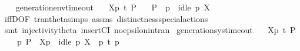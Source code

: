\begin{isabellebody}
\endisatagproof
{\isafoldproof}%
%
\isadelimproof
\isanewline
%
\endisadelimproof
\ \ \isanewline
{}\isamarkupfalse%
\ generation{\isacharunderscore}{\kern0pt}env{\isacharunderscore}{\kern0pt}timeout{\isacharcolon}{\kern0pt}\isanewline
\ \ \ {\isacartoucheopen}{\isasymtheta}{\isacharbrackleft}{\kern0pt}X{\isacharbrackright}{\kern0pt}{\isacharparenleft}{\kern0pt}p{\isacharparenright}{\kern0pt}\ {\isasymlongmapsto}\isactrlsup {\isasymtheta}t{\isacharunderscore}{\kern0pt}{\isasymepsilon}\ P{\isacharprime}{\kern0pt}{\isacartoucheclose}\isanewline
\ \ \ {\isacartoucheopen}P{\isacharprime}{\kern0pt}\ {\isacharequal}{\kern0pt}\ {\isasymtheta}{\isacharparenleft}{\kern0pt}p{\isacharparenright}{\kern0pt}\ {\isasymand}\ idle\ p\ X{\isacartoucheclose}\isanewline
%
\isadelimproof
\ \ %
\endisadelimproof
%
\isatagproof
{}\isamarkupfalse%
\ iffD{}{\isacharbrackleft}{\kern0pt}OF\ tran{\isacharunderscore}{\kern0pt}theta{\isachardot}{\kern0pt}simps\ assms{\isacharbrackright}{\kern0pt}\ distinctness{\isacharunderscore}{\kern0pt}special{\isacharunderscore}{\kern0pt}actions\isanewline
\ \ \isamarkupfalse%
\ {\isacharparenleft}{\kern0pt}smt\ injectivity{\isacharunderscore}{\kern0pt}theta{\isacharparenleft}{\kern0pt}{}{\isacharparenright}{\kern0pt}\ insertCI\ no{\isacharunderscore}{\kern0pt}epsilon{\isacharunderscore}{\kern0pt}in{\isacharunderscore}{\kern0pt}tran{\isacharparenleft}{\kern0pt}{}{\isacharparenright}{\kern0pt}{\isacharparenright}{\kern0pt}{\isacharplus}{\kern0pt}%
\endisatagproof
{\isafoldproof}%
%
\isadelimproof
\isanewline
%
\endisadelimproof
\isanewline
{}\isamarkupfalse%
\ generation{\isacharunderscore}{\kern0pt}sys{\isacharunderscore}{\kern0pt}timeout{\isacharcolon}{\kern0pt}\isanewline
\ \ \ {\isacartoucheopen}{\isasymtheta}{\isacharbrackleft}{\kern0pt}X{\isacharbrackright}{\kern0pt}{\isacharparenleft}{\kern0pt}p{\isacharparenright}{\kern0pt}\ {\isasymlongmapsto}\isactrlsup {\isasymtheta}t\ P{\isacharprime}{\kern0pt}{\isacartoucheclose}\isanewline
\ \ \ {\isacartoucheopen}{\isasymexists}\ p{\isacharprime}{\kern0pt}{\isachardot}{\kern0pt}\ P{\isacharprime}{\kern0pt}\ {\isacharequal}{\kern0pt}\ {\isasymtheta}{\isacharbrackleft}{\kern0pt}X{\isacharbrackright}{\kern0pt}{\isacharparenleft}{\kern0pt}p{\isacharprime}{\kern0pt}{\isacharparenright}{\kern0pt}\ {\isasymand}\ idle\ p\ X\ {\isasymand}\ p\ {\isasymlongmapsto}t\ p{\isacharprime}{\kern0pt}{\isacartoucheclose}\isanewline
%
\isadelimproof

\end{isabellebody}
